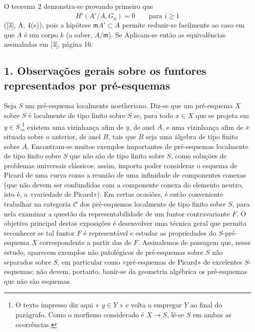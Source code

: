 O teorema 2 demonstra-se provando primeiro que
\[
  H^i(A'/A,G_a)=0\qquad\text{para }i\geq 1
\]
([3], A, 4(e)), pois a hipótese $\mathfrak mA'\subset A$ permite reduzir-se
facilmente ao caso em que $A$ é um corpo $k$ (a saber, $A/\mathfrak m$). Se
Aplicam-se então as equivalências assinaladas em [3], página 16.


\subsection*{1. Observações gerais sobre os funtores representados por pré-esquemas}

Seja $S$ um pré-esquema localmente noetheriano. Diz-se que um pré-esquema $X$
sobre $S$ é localmente de tipo finito sobre $S$ se, para todo
$x\in X$ que se projeta em $y\in S$,\footnote{O texto impresso diz aqui
« $y\in Y$ » e volta a empregar $Y$ ao final do parágrafo. Como o morfismo
considerado é $X\longrightarrow S$, lê-se $S$ em ambas as ocorrências.} existem
uma vizinhança afim de $y$, de anel $A$, e uma vizinhança afim de $x$ situada sobre
o anterior, de anel $B$, tais que $B$ seja uma álgebra de tipo finito sobre
$A$. Encontram-se muitos exemplos importantes de pré-esquemas localmente de
tipo finito sobre $S$ que não são de tipo finito sobre $S$, como soluções de
problemas universais clássicos; assim, importa poder considerar o esquema de
Picard de uma curva como a reunião de uma infinidade de componentes conexas
(que não devem ser confundidas com a componente conexa do elemento neutro, isto
é, a «variedade de Picard»). Em certas ocasiões, é então conveniente
trabalhar na categoria $\mathcal C$ dos pré-esquemas localmente de tipo
finito sobre $S$, para nela examinar a questão da representabilidade de
um funtor contravariante $F$. O objetivo principal destas exposições é
desenvolver uma técnica geral que permita reconhecer se tal funtor $F$ é
representável e estudar as propriedades do $S$-pré-esquema $X$ correspondente
a partir das de $F$. Assinalemos de passagem que, nesse estudo, aparecem
exemplos não patológicos de pré-esquemas sobre $S$ não separados sobre $S$, em
particular como «pré-esquemas de Picard» de excelentes $S$-esquemas; não devem,
portanto, banir-se da geometria algébrica os pré-esquemas que não são
esquemas.

